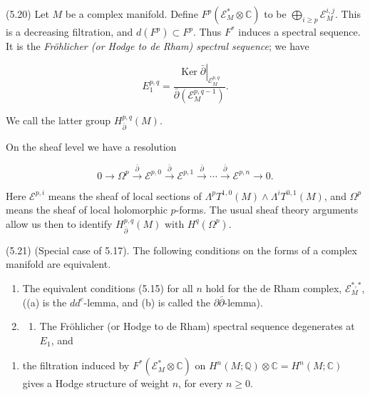\documentclass[
  english,
  a3paper,
  a3paper]{extarticle}
\providecommand{\tightlist}{%
  \setlength{\itemsep}{0pt}\setlength{\parskip}{0pt}}
\begin{document}
(5.20) Let \(M\) be a complex manifold. Define
\(F^p(\mathscr E_M^*\otimes\mathbb C)\) to be
\(\bigoplus_{i\ge p}\mathscr E_M^{i,j}\). This is a decreasing
filtration, and \(d(F^p)\subset F^p\). Thus \(F^*\) induces a spectral
sequence. It is the \emph{Fröhlicher (or Hodge to de Rham) spectral
sequence}; we have

\[E_1^{p,q}=\frac{\left.\operatorname{Ker}\bar\partial\right|_{\mathscr E_M^{p,q}}}{\bar\partial(\mathscr E_M^{p,q-1})}.\]

We call the latter group \(H_{\bar\partial}^{p,q}(M)\).

On the sheaf level we have a resolution

\[0\longrightarrow\Omega^p\xrightarrow{\bar\partial}\mathscr E^{p,0}\xrightarrow{\bar\partial}\mathscr E^{p,1}\xrightarrow{\bar\partial}\cdots\xrightarrow{\bar\partial}\mathscr E^{p,n}\longrightarrow0.\]

Here \(\mathscr E^{p,i}\) means the sheaf of local sections of
\(\Lambda^pT^{1,0}(M)\wedge\Lambda^iT^{0,1}(M)\), and \(\Omega^p\) means
the sheaf of local holomorphic \(p\)-forms. The usual sheaf theory
arguments allow us then to identify \(H_{\bar\partial}^{p,q}(M)\) with
\(H^q(\Omega^p)\).

(5.21) (Special case of 5.17). The following conditions on the forms of
a complex manifold are equivalent.

\begin{enumerate}
\def\labelenumi{(\arabic{enumi})}
\item
  The equivalent conditions (5.15) for all \(n\) hold for the de Rham
  complex, \(\mathscr E_M^{*,*}\), ((a) is the \(dd^c\)-lemma, and (b)
  is called the \(\partial\bar\partial\)-lemma).
\item
  \begin{enumerate}
  \def\labelenumii{\alph{enumii})}
  \tightlist
  \item
    The Fröhlicher (or Hodge to de Rham) spectral sequence degenerates
    at \(E_1\), and
  \end{enumerate}
\end{enumerate}

\begin{enumerate}
\def\labelenumi{\alph{enumi})}
\setcounter{enumi}{1}
\tightlist
\item
  the filtration induced by \(F^*(\mathscr E_M^*\otimes\mathbb C)\) on
  \(H^n(M;\mathbb Q)\otimes\mathbb C=H^n(M;\mathbb C)\) gives a Hodge
  structure of weight \(n\), for every \(n\ge0\).
\end{enumerate}
\end{document}
